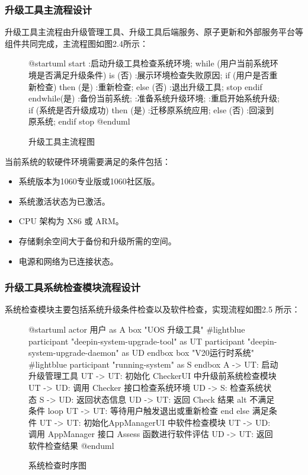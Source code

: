\documentclass{utart}
\begin{document}
\subsubsection{升级工具主流程设计}
升级工具主流程由升级管理工具、升级工具后端服务、原子更新和外部服务平台等组件共同完成，主流程图如图2.4所示：
\begin{figure}[H]
    \centering
    \begin{plantuml}
        @startuml
            start
            :启动升级工具检查系统环境;
            while (用户当前系统环境是否满足升级条件) is (否)
            :展示环境检查失败原因;
            if (用户是否重新检查) then (是)
            :重新检查;
            else (否)
            :退出升级工具;
            stop
            endif
            endwhile(是)
            :备份当前系统;
            :准备系统升级环境;
            :重启开始系统升级;
            if (系统是否升级成功) then (是)
            :迁移原系统应用;
            else (否)
            :回滚到原系统;
            endif
            stop
        @enduml
    \end{plantuml}
    \caption{升级工具主流程图}
    \label{fig:main}
\end{figure}

当前系统的软硬件环境需要满足的条件包括：
\begin{itemize}
    \item 系统版本为1060专业版或1060社区版。
    \item 系统激活状态为已激活。
    \item CPU 架构为 X86 或 ARM。
    \item 存储剩余空间大于备份和升级所需的空间。
    \item 电源和网络为已连接状态。
\end{itemize}

\subsubsection{升级工具系统检查模块流程设计}
系统检查模块主要包括系统升级条件检查以及软件检查，实现流程如图2.5 所示：
\begin{figure}[H]
    \centering
    \begin{plantuml}
        @startuml
        actor 用户 as A 
        box "UOS 升级工具" #lightblue
        participant "deepin-system-upgrade-tool" as UT
        participant "deepin-system-upgrade-daemon" as UD                             
        endbox
        box "V20运行时系统" #lightblue
        participant "running-system" as S
        endbox
        A -> UT: 启动升级管理工具
        UT -> UT: 初始化 CheckerUI 中升级前系统检查模块
        UT -> UD: 调用 Checker 接口检查系统环境
        UD -> S: 检查系统状态
        S -> UD: 返回状态信息
        UD -> UT: 返回 Check 结果  
        alt 不满足条件
        loop
        UT -> UT: 等待用户触发退出或重新检查
        end
        else 满足条件
        UT -> UT: 初始化AppManagerUI 中软件检查模块
        UT -> UD: 调用 AppManager 接口 Assess 函数进行软件评估
        UD -> UT: 返回软件检查结果
        @enduml
    \end{plantuml}
    \caption{系统检查时序图}
    \label{fig:systemcheck}
\end{figure}
\end{document}
